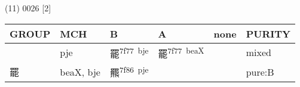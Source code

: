 \documentclass[14pt,a4paper]{scrartcl}
\begin{document}
(11) 0026 {[}2{]}

\begin{longtable}[c]{@{}llllll@{}}
\toprule
\begin{minipage}[b]{0.14\columnwidth}\raggedright\strut
GROUP
\strut\end{minipage} &
\begin{minipage}[b]{0.14\columnwidth}\raggedright\strut
MCH
\strut\end{minipage} &
\begin{minipage}[b]{0.14\columnwidth}\raggedright\strut
B
\strut\end{minipage} &
\begin{minipage}[b]{0.14\columnwidth}\raggedright\strut
A
\strut\end{minipage} &
\begin{minipage}[b]{0.14\columnwidth}\raggedright\strut
none
\strut\end{minipage} &
\begin{minipage}[b]{0.14\columnwidth}\raggedright\strut
PURITY
\strut\end{minipage}\tabularnewline
\midrule
\endhead
\begin{minipage}[t]{0.14\columnwidth}\raggedright\strut
𦋼
\strut\end{minipage} &
\begin{minipage}[t]{0.14\columnwidth}\raggedright\strut
pje
\strut\end{minipage} &
\begin{minipage}[t]{0.14\columnwidth}\raggedright\strut
罷\textsuperscript{7f77~bje}
\strut\end{minipage} &
\begin{minipage}[t]{0.14\columnwidth}\raggedright\strut
罷\textsuperscript{7f77~beaX}
\strut\end{minipage} &
\begin{minipage}[t]{0.14\columnwidth}\raggedright\strut
\strut\end{minipage} &
\begin{minipage}[t]{0.14\columnwidth}\raggedright\strut
mixed
\strut\end{minipage}\tabularnewline
\begin{minipage}[t]{0.14\columnwidth}\raggedright\strut
罷
\strut\end{minipage} &
\begin{minipage}[t]{0.14\columnwidth}\raggedright\strut
beaX, bje
\strut\end{minipage} &
\begin{minipage}[t]{0.14\columnwidth}\raggedright\strut
羆\textsuperscript{7f86~pje}
\strut\end{minipage} &
\begin{minipage}[t]{0.14\columnwidth}\raggedright\strut
\strut\end{minipage} &
\begin{minipage}[t]{0.14\columnwidth}\raggedright\strut
\strut\end{minipage} &
\begin{minipage}[t]{0.14\columnwidth}\raggedright\strut
pure:B
\strut\end{minipage}\tabularnewline
\bottomrule
\end{longtable}
\end{document}

